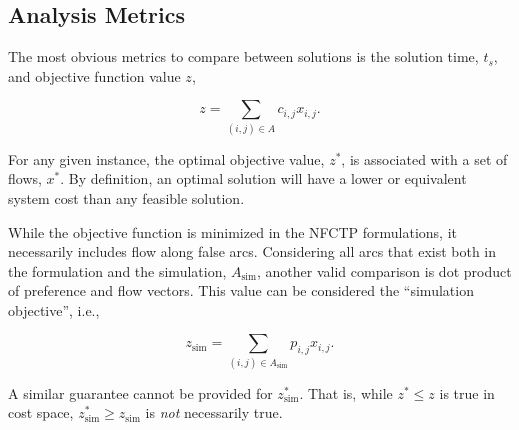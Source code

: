 \subsection{Analysis Metrics}

The most obvious metrics to compare between solutions is the solution time,
$t_s$, and objective function value $z$,

\begin{equation}\label{eqn:obj_flow}
z = \sum_{(i, j) \in A} c_{i, j} x_{i, j}.
\end{equation}

For any given instance, the optimal objective value, $z^*$, is associated with a
set of flows, $x^*$. By definition, an optimal solution will have a lower or
equivalent system cost than any feasible solution.

While the objective function is minimized in the NFCTP formulations, it
necessarily includes flow along false arcs. Considering all arcs that exist both
in the formulation and the simulation, $A_{\text{sim}}$, another valid
comparison is dot product of preference and flow vectors. This value can be
considered the ``simulation objective'', i.e.,

\begin{equation}\label{eqn:sim_flow}
z_{\text{sim}} = \sum_{(i, j) \in A_{\text{sim}}} p_{i, j} x_{i, j}.
\end{equation}

A similar guarantee cannot be provided for $z^*_{\text{sim}}$. That is, while
$z^* \leq z$ is true in cost space, $z^*_{\text{sim}} \geq z_{\text{sim}}$ is
\textit{not} necessarily true.



